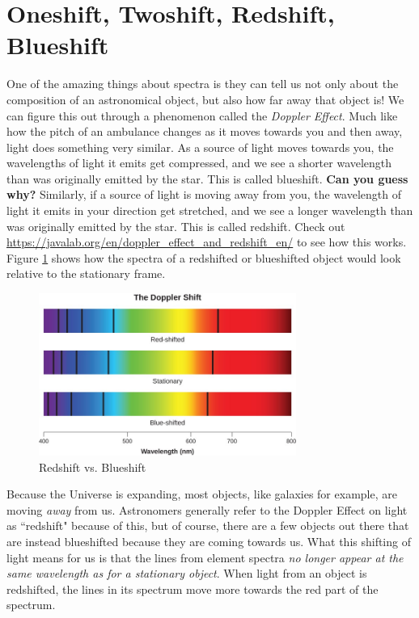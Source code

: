 \documentclass[11pt]{article}
\begin{document}
\section{Oneshift, Twoshift, Redshift, Blueshift}

One of the amazing things about spectra is they can tell us not only about the composition of an astronomical object, but also how far away that object is! We can figure this out through a phenomenon called the \textit{Doppler Effect}.  Much like how the pitch of an ambulance changes as it moves towards you and then away, light does something very similar.  As a source of light moves towards you, the wavelengths of light it emits get compressed, and we see a shorter wavelength than was originally emitted by the star.  This is called blueshift. \textbf{Can you guess why?}  Similarly, if a source of light is moving away from you, the wavelength of light it emits in your direction get stretched, and we see a longer wavelength than was originally emitted by the star. This is called redshift. Check out \url{https://javalab.org/en/doppler_effect_and_redshift_en/} to see how this works. Figure \ref{fig:redshift} shows how the spectra of a redshifted or blueshifted object would look relative to the stationary frame.

\begin{figure}[h!]
    \centering
    \includegraphics[width=0.75\textwidth]{Images/redshift.jpg}
    \caption{Redshift vs. Blueshift}
    \label{fig:redshift}
\end{figure}

\medskip \noindent
Because the Universe is expanding, most objects, like galaxies for example, are moving \textit{away} from us. Astronomers generally refer to the Doppler Effect on light as ``redshift" because of this, but of course, there are a few objects out there that are instead blueshifted because they are coming towards us. What this shifting of light means for us is that the lines from element spectra \textit{no longer appear at the same wavelength as for a stationary object}.  When light from an object is redshifted, the lines in its spectrum move more towards the red part of the spectrum.
\end{document}
